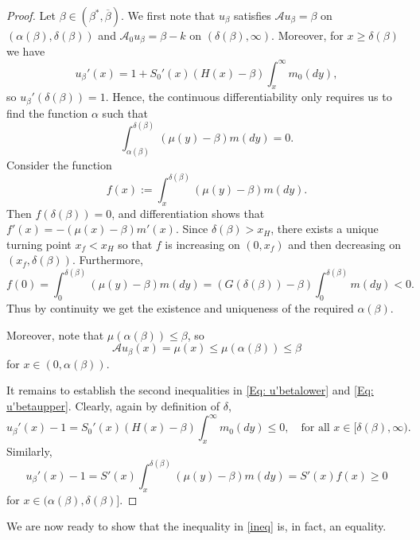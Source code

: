 \documentclass[12pt]{article}
\begin{document}
\begin{proof}
    Let $\beta \in (\beta^*, \overline{\beta})$. 
    We first note that $u_{\beta}$ satisfies $\mathcal{A}u_{\beta} = \beta$ on $(\alpha(\beta), \delta(\beta))$ and $\mathcal{A}_0u_{\beta} = \beta-k$ on $(\delta(\beta), \infty)$. Moreover, for $x\geq\delta(\beta)$ we have 
    \[u_{\beta}'(x) = 1+S_0'(x)(H(x)-\beta)\int_x^\infty m_0(dy),\]
    so $u_{\beta}'(\delta(\beta)) = 1$.
    Hence, the continuous differentiability only requires us to find the function $\alpha$ such that
    \begin{equation} \label{Eq: alphadef}
        \int_{\alpha(\beta)}^{\delta(\beta)} (\mu(y)-\beta) m(dy) = 0.
    \end{equation}
    Consider the function
    \begin{equation*}
       f(x) :=  \int_{x}^{\delta(\beta)} (\mu(y)-\beta) m(dy).
    \end{equation*}
    Then $f(\delta(\beta)) = 0$, and differentiation shows that $f'(x) =-(\mu(x)-\beta)m'(x)$. Since $\delta(\beta) > x_H$, there exists a unique turning point $x_f < x_H$ so that $f$ is increasing on $(0,x_f)$ and then decreasing on $(x_f,\delta(\beta))$. Furthermore,
    \begin{equation*}
        f(0) =  \int_{0}^{\delta(\beta)} (\mu(y)-\beta) m(dy) = (G(\delta(\beta))-\beta) \int_0^{\delta(\beta)}m(dy) < 0.
    \end{equation*}
    Thus by continuity we get the existence and uniqueness of the required $\alpha(\beta)$. 

    Moreover, note that $\mu(\alpha(\beta))\leq \beta$, so 
    \[\mathcal A u_\beta(x)=\mu(x)\leq\mu(\alpha(\beta))\leq \beta\]
    for $x\in(0,\alpha(\beta))$.

    It remains to establish the second inequalities in \eqref{Eq: u'betalower} and \eqref{Eq: u'betaupper}. Clearly, again by definition of $\delta$,
    \begin{equation*}
        u_{\beta}'(x)- 1  = S_0'(x) (H(x)-\beta) \int_x^{\infty} m_0(dy) \leq 0, \quad \text{for all } x \in [\delta(\beta),\infty).
    \end{equation*}
    Similarly,  
    \begin{equation*}
        u_{\beta}'(x)-1  = S'(x)\int^{\delta(\beta)}_{x} (\mu(y)-\beta)m(dy)= S'(x)f(x) \geq 0 
    \end{equation*}
    for $x \in (\alpha(\beta),\delta(\beta)]$.
\end{proof}

We are now ready to show that the inequality in \eqref{ineq} is, in fact, an equality.
\end{document}
